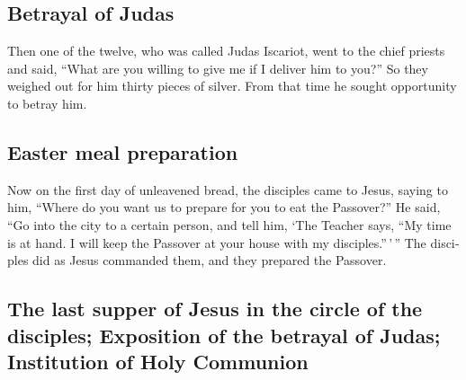\begin{paracol}{2}
\begin{otherlanguage}{english}
\hypertarget{betrayal-of-judas}{%
\subsection{Betrayal of Judas}\label{betrayal-of-judas}}

 Then one of the twelve, who was called Judas Iscariot,
went to the chief priests  and said, ``What are you
willing to give me if I deliver him to you?'' So they weighed out for
him thirty pieces of silver.  From that time he sought
opportunity to betray him.

\hypertarget{easter-meal-preparation}{%
\subsection{Easter meal preparation}\label{easter-meal-preparation}}

 Now on the first day of unleavened bread, the disciples
came to Jesus, saying to him, ``Where do you want us to prepare for you
to eat the Passover?''  He said, ``Go into the city to a
certain person, and tell him, `The Teacher says, ``My time is at hand. I
will keep the Passover at your house with my disciples.''\,'\,''
 The disciples did as Jesus commanded them, and they
prepared the Passover.

\hypertarget{the-last-supper-of-jesus-in-the-circle-of-the-disciples-exposition-of-the-betrayal-of-judas-institution-of-holy-communion}{%
\subsection{The last supper of Jesus in the circle of the disciples;
Exposition of the betrayal of Judas; Institution of Holy
Communion}\label{the-last-supper-of-jesus-in-the-circle-of-the-disciples-exposition-of-the-betrayal-of-judas-institution-of-holy-communion}}


\end{otherlanguage}
\end{paracol}
